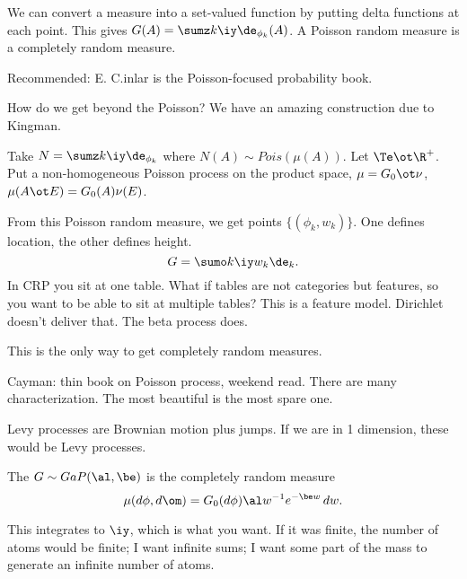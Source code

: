 We can convert a measure into a set-valued function by putting delta functions at each point. 
This gives $G(A) = \sumz k{\iy} \de_{\phi_k}(A)$. A Poisson random measure is a completely random measure.

Recommended: E. C.inlar is the Poisson-focused probability book.

How do we get beyond the Poisson? We have an amazing construction due to Kingman.

Take $N=\sumz k\iy \de_{\phi_k}$ where $N(A) \sim Pois(\mu(A))$. Let $\Te \ot \R^+$. Put a non-homogeneous Poisson process on the product space, $\mu = G_0\ot \nu$, $\mu(A\ot E) = G_0(A) \nu(E)$. 

From this Poisson random measure, we get  points $\{(\phi_k,w_k)\}$. One defines location, the other defines height.
$$
G=\sumo k\iy w_k \de_k.
$$
In CRP you sit at one table. What if tables are not categories but features, so you want to be able to sit at multiple tables? This is a feature model. Dirichlet doesn't deliver that. The beta process does.


This is the only way to get completely random measures. %

Cayman: thin book on Poisson process, weekend read. There are many characterization. The most beautiful is the most spare one.

Levy processes are Brownian motion plus jumps. If we are in 1 dimension, these would be Levy processes.

\begin{df}
The  $G\sim GaP(\al, \be)$ is the completely random measure 
$$\mu(d\phi, d\om) = G_0(d\phi) \al w^{-1} e^{-\be w}\,dw.$$
\end{df}
This integrates to $\iy$, which is what you want. If it was finite, the number of atoms would be finite; I want infinite sums; I want some part of the mass to generate an infinite number of atoms. 

